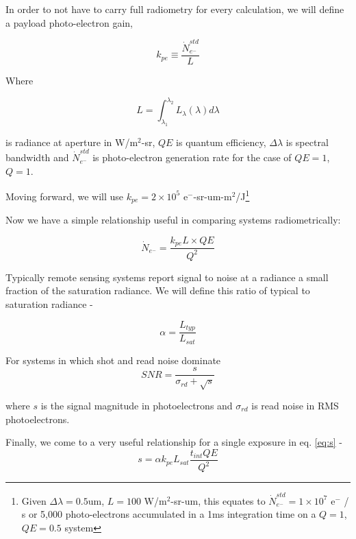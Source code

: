 \documentclass[10pt,journal]{IEEEtran}  %
\begin{document}
{In order to not have to carry full radiometry for every calculation, we will define a payload photo-electron gain, 

\begin{equation}
k_{pe} \equiv \frac{\dot{N}_{e^-}^{std}}{L}
\label{eq:k_pe}
\end{equation}

Where 

\begin{equation*}
    L = \int_{\lambda_1}^{\lambda_2}L_{\lambda}(\lambda)d\lambda
\end{equation*}

is radiance at aperture in W/m$^2$-sr, $QE$ is quantum efficiency, $\Delta \lambda$ is spectral bandwidth and $\dot{N}_{e^-}^{std}$ is photo-electron generation rate for the case of $QE=1$, $Q=1$.

Moving forward, we will use $k_{pe} = 2\times 10^5$ e$^-$-sr-um-m$^2$/J\footnote{Given $\Delta \lambda = 0.5$um, $L = 100$ W/m$^2$-sr-um, this equates to $\dot{N}_{e^-}^{std} = 1\times 10^7$ e$^-$ / s or 5,000 photo-electrons accumulated in a 1ms integration time on a $Q=1$, $QE=0.5$ system}

Now we have a simple relationship useful in comparing systems radiometrically:

\begin{equation}
\dot{N}_{e^-} = \frac{k_{pe} L \times QE}{Q^2}
\label{eq:N_e_dot}
\end{equation}

Typically remote sensing systems report signal to noise at a radiance a small fraction of the saturation radiance.  We will define this ratio of typical to saturation radiance - 

\begin{equation}
\alpha = \frac{L_{typ}}{L_{sat}}
\label{eq:alpha}
\end{equation}

For systems in which shot and read noise dominate
\begin{equation}
SNR = \frac{s}{\sigma_{rd} + \sqrt{s}}
\label{eq:snr}
\end{equation}

where $s$ is the signal magnitude in photoelectrons and $\sigma_{rd}$ is read noise in RMS photoelectrons.

Finally, we come to a very useful relationship for a single exposure in eq. \ref{eq:s} -
\begin{equation}
s = \alpha k_{pe}L_{sat} \frac{t_{int}QE}{Q^2}
\label{eq:s}
\end{equation}

}
\end{document}

